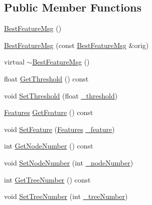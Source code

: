 \subsection*{Public Member Functions}
\begin{DoxyCompactItemize}
\item 
\hyperlink{classrdf_1_1bpc_1_1BestFeatureMsg_a6a586e4d7b8c4220176cf84ac7348a7d}{Best\+Feature\+Msg} ()
\item 
\hyperlink{classrdf_1_1bpc_1_1BestFeatureMsg_a29d3de822225c6675886108a04948d67}{Best\+Feature\+Msg} (const \hyperlink{classrdf_1_1bpc_1_1BestFeatureMsg}{Best\+Feature\+Msg} \&orig)
\item 
virtual \hyperlink{classrdf_1_1bpc_1_1BestFeatureMsg_a73780143fc64dace2584c3e91c49818b}{$\sim$\+Best\+Feature\+Msg} ()
\item 
float \hyperlink{classrdf_1_1bpc_1_1BestFeatureMsg_a62cf5b6e9c1ff7c3e17b1fa4bb6bdcf7}{Get\+Threshold} () const 
\item 
void \hyperlink{classrdf_1_1bpc_1_1BestFeatureMsg_a9099e3dfd687934a25eee58c3322e47f}{Set\+Threshold} (float \hyperlink{classrdf_1_1bpc_1_1BestFeatureMsg_aababadc862b2794ea24eb37128b2648f}{\+\_\+threshold})
\item 
\hyperlink{classrdf_1_1bpc_1_1Features}{Features} \hyperlink{classrdf_1_1bpc_1_1BestFeatureMsg_ae25e411935ae331d9427da3707bc0d2c}{Get\+Feature} () const 
\item 
void \hyperlink{classrdf_1_1bpc_1_1BestFeatureMsg_acabaf5de41b98f94265bd0582f5fd207}{Set\+Feature} (\hyperlink{classrdf_1_1bpc_1_1Features}{Features} \hyperlink{classrdf_1_1bpc_1_1BestFeatureMsg_a7b383b71e2a03d3491d1fabc810c607f}{\+\_\+feature})
\item 
int \hyperlink{classrdf_1_1bpc_1_1BestFeatureMsg_a5f92bf9cfd7009fe5478e7eefc94698f}{Get\+Node\+Number} () const 
\item 
void \hyperlink{classrdf_1_1bpc_1_1BestFeatureMsg_a0c6d0a13e6f27d6ab8c32408fadbd16d}{Set\+Node\+Number} (int \hyperlink{classrdf_1_1bpc_1_1BestFeatureMsg_a50e19bc479f97975aac7194d444d283c}{\+\_\+node\+Number})
\item 
int \hyperlink{classrdf_1_1bpc_1_1BestFeatureMsg_a1083940d56360c005916a80a2ce3612c}{Get\+Tree\+Number} () const 
\item 
void \hyperlink{classrdf_1_1bpc_1_1BestFeatureMsg_a6f2ef9783627a7d3ccf8256289c1044b}{Set\+Tree\+Number} (int \hyperlink{classrdf_1_1bpc_1_1BestFeatureMsg_a6d8b8a53e1baf9a008e0320839002728}{\+\_\+tree\+Number})
\end{DoxyCompactItemize}
